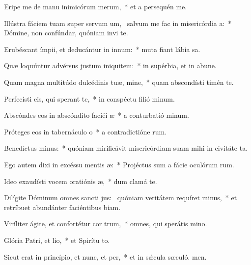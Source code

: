 \item Eripe me de manu inimicórum merum,~* et a persequén me.
\item Illústra fáciem tuam super servum um,~\pscross{} salvum me fac in misericórdia a:~* Dómine, non confúndar, quóniam invi te.
\item Erubéscant ímpii, et deducántur in innum:~* muta fiant lábia sa.
\item Quæ loquúntur advérsus justum iniquitem:~* in supérbia, et in abune.
\item Quam magna multitúdo dulcédinis tuæ, mine,~* quam abscondísti timén te.
\item Perfecísti eis, qui sperant  te,~* in conspéctu filió minum.
\item Abscóndes eos in abscóndito faciéi æ~* a conturbatió minum.
\item Próteges eos in tabernáculo o~* a contradictióne rum.
\item Benedíctus minus:~* quóniam mirificávit misericórdiam suam mihi in civitáte ta.
\item Ego autem dixi in excéssu mentis æ:~* Projéctus sum a fácie oculórum rum.
\item Ideo exaudísti vocem oratiónis æ,~* dum clamá  te.
\item Dilígite Dóminum omnes sancti jus:~\pscross{} quóniam veritátem requíret minus,~* et retríbuet abundánter faciéntibus biam.
\item Viríliter ágite, et confortétur cor trum,~* omnes, qui sperátis  mino.
\item Glória Patri, et lio,~* et Spirítu to.
\item Sicut erat in princípio, et nunc, et per,~* et in sǽcula sæculó. men.

